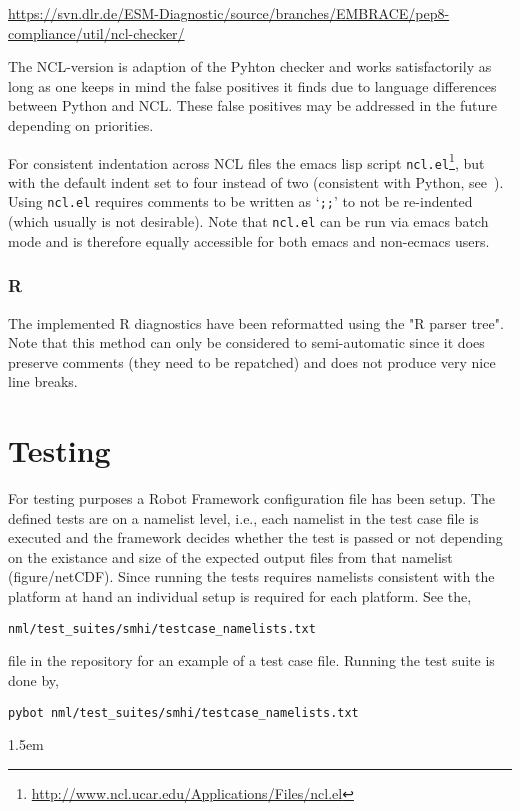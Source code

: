 \documentclass[12pt]{article}
\begin{document}
\begin{sloppypar}
\url{https://svn.dlr.de/ESM-Diagnostic/source/branches/EMBRACE/pep8-compliance/util/ncl-checker/}
\end{sloppypar}

The NCL-version is adaption of the Pyhton checker and works
satisfactorily as long as one keeps in mind the false positives it
finds due to language differences between Python and NCL. These false
positives may be addressed in the future depending on priorities.

For consistent indentation across NCL files the emacs lisp script
\texttt{ncl.el}\footnote{\url{http://www.ncl.ucar.edu/Applications/Files/ncl.el}},
but with the default indent set to four instead of two (consistent
with Python, see~\cite{pep8:2001}). Using \texttt{ncl.el} requires
comments to be written as `\texttt{;;}' to not be re-indented (which
usually is not desirable). Note that \texttt{ncl.el} can be run via
emacs batch mode and is therefore equally accessible for both emacs
and non-ecmacs users.

\subsubsection{R}
The implemented R diagnostics have been reformatted using the "R
parser tree"\cite{Tidying-R-code}. Note that this method can only be
considered to semi-automatic since it does preserve comments (they
need to be repatched) and does not produce very nice line breaks.



\section{Testing}\label{section:testing}
For testing purposes a Robot Framework\cite{Robot-Framework}
configuration file has been setup. The defined tests are on a namelist
level, i.e., each namelist in the test case file is executed and the
framework decides whether the test is passed or not depending on the
existance and size of the expected output files from that namelist
(figure/netCDF). Since running the tests requires namelists consistent
with the platform at hand an individual setup is required for each
platform. See the, 

\begin{Verbatim}[frame=single, fontsize=\footnotesize]
nml/test_suites/smhi/testcase_namelists.txt
\end{Verbatim}
file in the repository\cite{ESMValTool_repo} for an example of a test
case file. Running the test suite is done by, 

\begin{Verbatim}[frame=single, fontsize=\footnotesize]
pybot nml/test_suites/smhi/testcase_namelists.txt
\end{Verbatim}


% 
% 

\begingroup
\raggedright
\emergencystretch 1.5em

\endgroup
\end{document}
